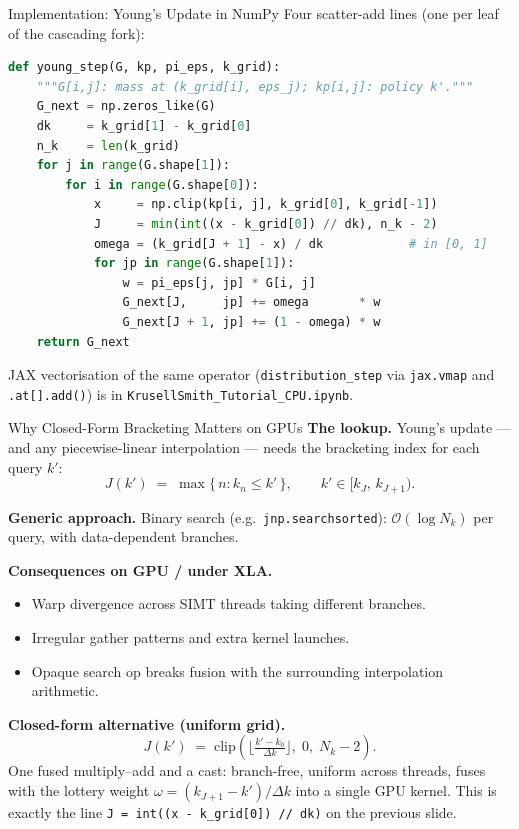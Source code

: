 \documentclass[aspectratio=169,11pt]{beamer}
\newcommand{\emphc}[1]{\textcolor{harvardcrimson}{#1}}
\begin{document}
\begin{frame}[fragile]{Implementation: Young's Update in NumPy}
\footnotesize
Four scatter-add lines (one per leaf of the cascading fork):

\begin{lstlisting}[language=Python, basicstyle=\tiny\ttfamily, frame=single, backgroundcolor=\color{uzhgreylight}, numbers=none, aboveskip=2pt, belowskip=2pt]
def young_step(G, kp, pi_eps, k_grid):
    """G[i,j]: mass at (k_grid[i], eps_j); kp[i,j]: policy k'."""
    G_next = np.zeros_like(G)
    dk     = k_grid[1] - k_grid[0]
    n_k    = len(k_grid)
    for j in range(G.shape[1]):
        for i in range(G.shape[0]):
            x     = np.clip(kp[i, j], k_grid[0], k_grid[-1])
            J     = min(int((x - k_grid[0]) // dk), n_k - 2)
            omega = (k_grid[J + 1] - x) / dk            # in [0, 1]
            for jp in range(G.shape[1]):
                w = pi_eps[j, jp] * G[i, j]
                G_next[J,     jp] += omega       * w
                G_next[J + 1, jp] += (1 - omega) * w
    return G_next
\end{lstlisting}

\vspace{0.1em}
{\scriptsize JAX vectorisation of the same operator (\texttt{distribution\_step} via \texttt{jax.vmap} and \texttt{.at[].add()}) is in \texttt{KrusellSmith\_Tutorial\_CPU.ipynb}.}
\end{frame}

\begin{frame}{Why Closed-Form Bracketing Matters on GPUs}
\footnotesize
\textbf{The lookup.}  Young's update --- and any piecewise-linear interpolation --- needs the bracketing index for each query $k'$:
\[
  J(k') \;=\; \max\{\,n : k_n \le k'\,\},\qquad k' \in [k_J,\, k_{J+1}).
\]

\vspace{0.4em}
\textbf{Generic approach.}  Binary search (e.g.\ \texttt{jnp.searchsorted}): $\mathcal{O}(\log N_k)$ per query, with data-dependent branches.

\vspace{0.4em}
\textbf{Consequences on GPU / under XLA.}
\begin{itemize}\itemsep1pt
  \item \emphc{Warp divergence} across SIMT threads taking different branches.
  \item Irregular gather patterns and extra kernel launches.
  \item Opaque search op breaks fusion with the surrounding interpolation arithmetic.
\end{itemize}

\vspace{0.4em}
\textbf{Closed-form alternative (uniform grid).}
\[
  J(k') \;=\; \mathrm{clip}\!\left(\Big\lfloor \tfrac{k' - k_0}{\Delta k}\Big\rfloor,\;0,\;N_k-2\right).
\]
\emphc{One fused multiply--add and a cast}: branch-free, uniform across threads, fuses with the lottery weight $\omega = (k_{J+1}-k')/\Delta k$ into a single GPU kernel.  This is exactly the line \texttt{J = int((x - k\_grid[0]) // dk)} on the previous slide.
\end{frame}
\end{document}
